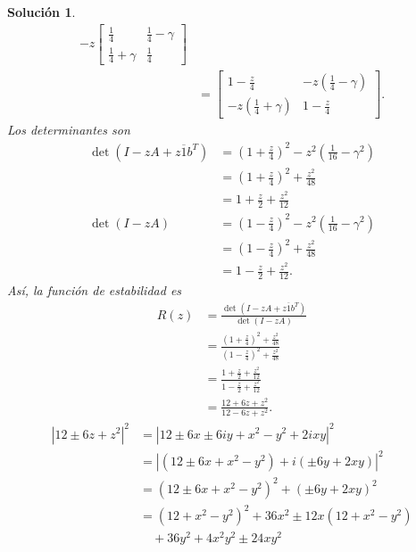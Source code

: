\documentclass[11pt]{article}
\newtheorem*{sol}{Solución}
\newcommand\ol\overline
\begin{document}
\begin{sol}
\begin{align}
    -z
    \begin{bmatrix}
      \frac{1}{4} & \frac{1}{4} - \gamma \\[3mm]
      \frac{1}{4} + \gamma & \frac{1}{4}
    \end{bmatrix}
    \\
    &=
    \begin{bmatrix}
      1-\frac{z}{4}
        & -z(\frac{1}{4} - \gamma)
        \\[3mm]
      -z(\frac{1}{4} + \gamma)
        & 1-\frac{z}{4}
    \end{bmatrix}
  .\end{align}
  Los determinantes son
  \begin{align}
    \det(I-zA+z\ol 1b^T)
    &= \left(1+\frac{z}{4}\right)^{2}
      - z^{2}\left(\frac{1}{16}-\gamma^{2}\right) \\
    &= \left(1+\frac{z}{4}\right)^{2} + \frac{z^{2}}{48} \\
    &= 1 + \frac{z}{2} + \frac{z^{2}}{12}
    \\
    \det(I-zA)
    &= \left(1-\frac{z}{4}\right)^{2}
      - z^{2}\left(\frac{1}{16} - \gamma^{2}\right) \\
    &= \left(1-\frac{z}{4}\right)^{2} + \frac{z^{2}}{48} \\
    &= 1 - \frac{z}{2} + \frac{z^{2}}{12}
  .\end{align}
  Así, la función de estabilidad es
  \begin{align}
    R(z)
    &= \frac{\det(I-zA+z\ol 1b^T)}{\det(I-zA)}
      \\
    &= \frac
      {\left(1+\frac{z}{4}\right)^{2} + \frac{z^{2}}{48}}
      {\left(1-\frac{z}{4}\right)^{2} + \frac{z^{2}}{48}}
      \\
    &= \frac
      {1 + \frac{z}{2} + \frac{z^{2}}{12}}
      {1 - \frac{z}{2} + \frac{z^{2}}{12}}
      \\
    &= \frac
      {12 + 6z + z^{2}}
      {12 - 6z + z^{2}}
  .\end{align}
  \begin{align}
    |12 \pm 6z + z^{2}|^{2}
    &= |12 \pm 6x \pm 6iy + x^{2}-y^{2}+2ixy|^{2} \\
    &= |(12 \pm 6x + x^{2}-y^{2}) + i(\pm 6y +2xy)|^{2} \\
    &= (12 \pm 6x + x^{2}-y^{2})^{2} + (\pm 6y +2xy)^{2} \\
    &= (12 + x^{2}-y^{2})^{2} + 36x^{2} \pm 12x(12 + x^{2}-y^{2}) \\
      &\quad + 36y^2 + 4x^{2}y^{2} \pm 24xy^{2} \\

\end{align}
\end{sol}
\end{document}
